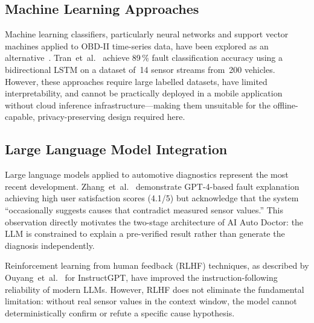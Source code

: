 \subsection{Machine Learning Approaches}

Machine learning classifiers, particularly neural networks and support vector machines applied to OBD-II time-series data, have been explored as an alternative~\cite{yan2017}.
Tran~et~al.~\cite{tran2023} achieve 89\,\% fault classification accuracy using a bidirectional LSTM on a dataset of~14 sensor streams from~200 vehicles.
However, these approaches require large labelled datasets, have limited interpretability, and cannot be practically deployed in a mobile application without cloud inference infrastructure---making them unsuitable for the offline-capable, privacy-preserving design required here.

\subsection{Large Language Model Integration}

Large language models applied to automotive diagnostics represent the most recent development.
Zhang~et~al.~\cite{zhang2024gpt} demonstrate GPT-4-based fault explanation achieving high user satisfaction scores (4.1/5) but acknowledge that the system ``occasionally suggests causes that contradict measured sensor values.''
This observation directly motivates the two-stage architecture of AI Auto Doctor: the LLM is constrained to explain a pre-verified result rather than generate the diagnosis independently.

Reinforcement learning from human feedback (RLHF) techniques, as described by Ouyang~et~al.~\cite{ouyang2022} for InstructGPT, have improved the instruction-following reliability of modern LLMs.
However, RLHF does not eliminate the fundamental limitation: without real sensor values in the context window, the model cannot deterministically confirm or refute a specific cause hypothesis.

